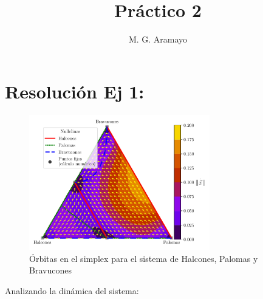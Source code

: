 \documentclass[twocolumn,aps,prl]{revtex4-1}
\begin{document}

\title{Práctico 2}
\author{M. G. Aramayo}


\maketitle

\section{Resolución Ej 1:}


\begin{figure}[ht!]
    \centering
        \includegraphics[width = 0.7\textwidth]{figuras/ex01-a.pdf}
    \caption{Órbitas en el simplex para el sistema de Halcones, Palomas y Bravucones}
    \label{fig:figuras/ex01-a}
\end{figure}


Analizando la dinámica del sistema:
\end{document}
